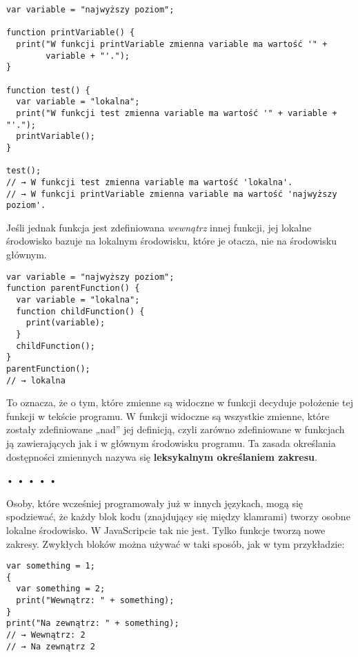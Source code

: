     
\begin{verbatim} 
var variable = "najwyższy poziom";

function printVariable() {
  print("W funkcji printVariable zmienna variable ma wartość '" +
        variable + "'.");
}

function test() {
  var variable = "lokalna";
  print("W funkcji test zmienna variable ma wartość '" + variable + "'.");
  printVariable();
}

test();
// → W funkcji test zmienna variable ma wartość 'lokalna'.
// → W funkcji printVariable zmienna variable ma wartość 'najwyższy poziom'.
\end{verbatim}
    
Jeśli jednak funkcja jest zdefiniowana \emph{wewnątrz} innej funkcji, jej lokalne środowisko bazuje na lokalnym środowisku, które je otacza, nie na środowisku głównym.

    
\begin{verbatim} 
var variable = "najwyższy poziom";
function parentFunction() {
  var variable = "lokalna";
  function childFunction() {
    print(variable);
  }
  childFunction();
}
parentFunction();
// → lokalna
\end{verbatim}
    
To oznacza, że o tym, które zmienne są widoczne w funkcji decyduje położenie tej funkcji w tekście programu. W funkcji widoczne są wszystkie zmienne, które zostały zdefiniowane „nad” jej definicją, czyli zarówno zdefiniowane w funkcjach ją zawierających jak i w głównym środowisku programu. Ta zasada określania dostępności zmiennych nazywa się \textbf{leksykalnym określaniem zakresu}.

  
  
\begin{center}
• • • • •
\end{center}
  
    
Osoby, które wcześniej programowały już w innych językach, mogą się spodziewać, że każdy blok kodu (znajdujący się między klamrami) tworzy osobne lokalne środowisko. W JavaScripcie tak nie jest. Tylko funkcje tworzą nowe zakresy. Zwykłych bloków można używać w taki sposób, jak w tym przykładzie:

    
\begin{verbatim} 
var something = 1;
{
  var something = 2;
  print("Wewnątrz: " + something);
}
print("Na zewnątrz: " + something);
// → Wewnątrz: 2
// → Na zewnątrz 2
\end{verbatim}
    
